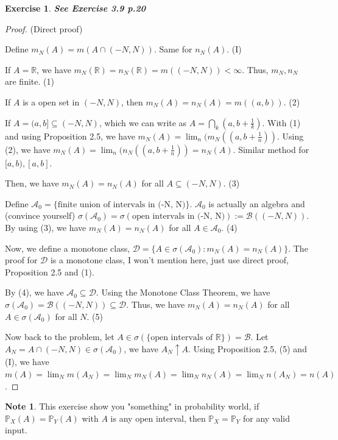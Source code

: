 \documentclass[11pt,a4paper]{article}
\theoremstyle{definition}
\newtheorem{exercise}[definition]{Exercise}
\newtheorem{note}[definition]{Note}
\theoremstyle{plain}
\newcommand{\R}{\mathbb{R}}
\newcommand{\A}{\mathcal{A}}
\newcommand{\Prob}{\mathbb{P}}
\begin{document}
\begin{exercise}
\textbf{\textit{See Exercise 3.9 p.20}}
\begin{proof}
(Direct proof)

Define $m_N(A) = m(A\cap (-N,N))$. Same for $n_N(A)$. (I)

If $A = \R$, we have $m_N(\R) = n_N(\R) = m((-N,N)) < \infty$. Thus, $m_N, n_N$ are finite. (1)

If $A$ is a open set in $(-N, N)$, then $m_N(A) = n_N(A) = m((a,b))$. (2)

If $A = (a,b] \subseteq (-N, N)$, which we can write as $A = \bigcap_k(a,b +\frac{1}{k})$. With (1) and using Proposition 2.5, we have $m_N(A) = \lim_n(m_N((a, b + \frac{1}{n}))$. Using (2), we have $m_N(A) = \lim_n(n_N((a, b + \frac{1}{n})) = n_N(A)$. Similar method for $[a, b), [a,b]$.

Then, we have $m_N(A) = n_N(A)$ for all $A \subseteq (-N,N)$. (3)

Define $\A_0 = \{\text{finite union of intervals in (-N, N)}\}$. $\A_0$ is actually an algebra and (convince yourself) $\sigma(\A_0) = \sigma(\text{open intervals in (-N, N)}) := \mathcal{B}((-N,N))$. By using (3), we have $m_N(A) = n_N(A)$ for all $A \in \A_0$. (4)

Now, we define a monotone class, $\mathcal{D} = \{A\in \sigma(\A_0): m_N(A) = n_N(A)\}$. The proof for $\mathcal{D}$ is a monotone class, I won't mention here, just use direct proof, Proposition 2.5 and (1).

By (4), we have $\A_0 \subseteq \mathcal{D}$. Using the Monotone Class Theorem, we have $\sigma(\A_0) = \mathcal{B}((-N,N)) \subseteq \mathcal{D}$. Thus, we have $m_N(A) = n_N(A)$ for all $A \in \sigma(\A_0)$ for all $N$. (5)

Now back to the problem, let $A \in \sigma(\{\text{open intervals of }\R\}) = \mathcal{B}$. Let $A_N = A\cap(-N,N) \in \sigma(\A_0)$, we have $A_N \uparrow A$. Using Proposition 2.5, (5) and (I), we have $m(A) = \lim_Nm(A_N) = \lim_Nm_N(A) = \lim_Nn_N(A) = \lim_Nn(A_N) = n(A)$.

\end{proof}

\begin{note}
This exercise show you "something" in probability world, if $\Prob_X(A) = \Prob_Y(A)$ with $A$ is any open interval, then $\Prob_X = \Prob_Y$ for any valid input.
\end{note}
\end{exercise}
\end{document}
